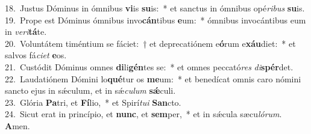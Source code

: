 {18.~}Justus Dóminus in ómnibus \textbf{vi}is \textbf{su}is:~* et sanctus in ómnibus opé\textit{ri}\textit{bus} \textbf{su}is.\\
{19.~}Prope est Dóminus ómnibus invo\textbf{cán}tibus \textbf{e}um:~* ómnibus invocántibus eum in \textit{ve}\textit{ri}\textbf{tá}te.\\
{20.~}Voluntátem timéntium se fáciet:~† et deprecatiónem e\textbf{ó}rum e\textbf{xáu}diet:~* et salvos fá\textit{ci}\textit{et} \textbf{e}os.\\
{21.~}Custódit Dóminus omnes \textbf{di}li\textbf{gén}tes se:~* et omnes peccató\textit{res} \textit{di}\textbf{spér}det.\\
{22.~}Laudatiónem Dómini lo\textbf{qué}tur os \textbf{me}um:~* et benedícat omnis caro nómini sancto ejus in sǽculum, et in sǽ\textit{cu}\textit{lum} \textbf{sǽ}culi.\\
{23.~}Glória \textbf{Pa}tri, et \textbf{Fí}lio,~* et Spirí\textit{tu}\textit{i} \textbf{San}cto.\\
{24.~}Sicut erat in princípio, et \textbf{nunc}, et \textbf{sem}per,~* et in sǽcula sæcu\textit{ló}\textit{rum}. \textbf{A}men.\\
